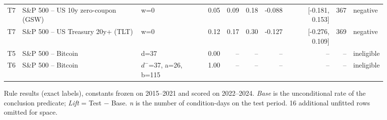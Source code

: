 \begin{figure}[t]
{\begin{tabular}{lllrrrrrrl}
T7 & S\&P 500 -- US 10y zero-coupon (GSW) & w=0 & 0.05 & 0.09 & 0.18 & -0.088 & [-0.181, 0.153] & 367 & negative \\
T7 & S\&P 500 -- US Treasury 20y+ (TLT) & w=0 & 0.12 & 0.17 & 0.30 & -0.127 & [-0.276, 0.109] & 369 & negative \\
T5 & S\&P 500 -- Bitcoin & d=37 & 0.00 & -- & -- & -- & -- & -- & ineligible \\
T6 & S\&P 500 -- Bitcoin & $d^-$=37, a=26, b=115 & 1.00 & -- & -- & -- & -- & -- & ineligible \\
\bottomrule
\end{tabular}
}
\caption{Rule results (exact labels), constants frozen on 2015--2021 and scored on 2022--2024. \emph{Base} is the unconditional rate of the conclusion predicate; \emph{Lift} = Test $-$ Base. \emph{n} is the number of condition-days on the test period. 16 additional unfitted rows omitted for space.}
\label{tab:rule-results-pub}
\end{figure}
